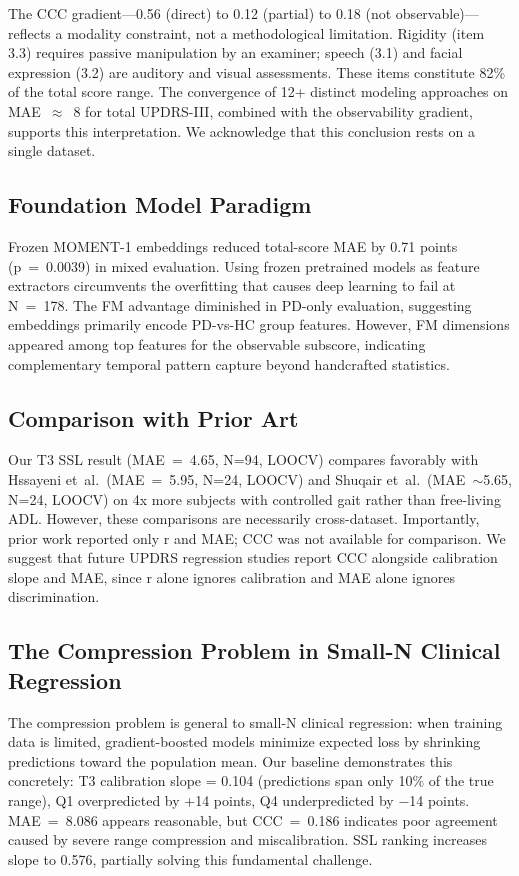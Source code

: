 \documentclass[11pt]{article}
\begin{document}
The CCC gradient---0.56 (direct) to 0.12 (partial) to 0.18 (not observable)---reflects a modality constraint, not a methodological limitation. Rigidity (item 3.3) requires passive manipulation by an examiner; speech (3.1) and facial expression (3.2) are auditory and visual assessments. These items constitute 82\% of the total score range. The convergence of 12+ distinct modeling approaches on MAE~$\approx$~8 for total UPDRS-III, combined with the observability gradient, supports this interpretation. We acknowledge that this conclusion rests on a single dataset.

\subsection{Foundation Model Paradigm}

Frozen MOMENT-1 embeddings reduced total-score MAE by 0.71 points (p~=~0.0039) in mixed evaluation. Using frozen pretrained models as feature extractors circumvents the overfitting that causes deep learning to fail at N~=~178. The FM advantage diminished in PD-only evaluation, suggesting embeddings primarily encode PD-vs-HC group features. However, FM dimensions appeared among top features for the observable subscore, indicating complementary temporal pattern capture beyond handcrafted statistics.

\subsection{Comparison with Prior Art}

Our T3 SSL result (MAE~=~4.65, N=94, LOOCV) compares favorably with Hssayeni et~al.\ (MAE~=~5.95, N=24, LOOCV) and Shuqair et~al.\ (MAE~$\sim$5.65, N=24, LOOCV) on 4x more subjects with controlled gait rather than free-living ADL. However, these comparisons are necessarily cross-dataset. Importantly, prior work reported only r and MAE; CCC was not available for comparison. We suggest that future UPDRS regression studies report CCC alongside calibration slope and MAE, since r alone ignores calibration and MAE alone ignores discrimination.

\subsection{The Compression Problem in Small-N Clinical Regression}

The compression problem is general to small-N clinical regression: when training data is limited, gradient-boosted models minimize expected loss by shrinking predictions toward the population mean. Our baseline demonstrates this concretely: T3 calibration slope = 0.104 (predictions span only 10\% of the true range), Q1 overpredicted by +14 points, Q4 underpredicted by $-$14 points. MAE~=~8.086 appears reasonable, but CCC~=~0.186 indicates poor agreement caused by severe range compression and miscalibration. SSL ranking increases slope to 0.576, partially solving this fundamental challenge.
\end{document}
